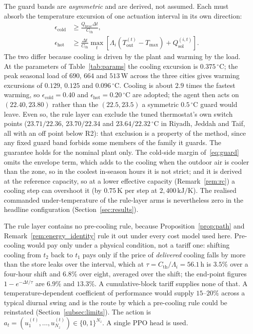 \documentclass[3p,twocolumn,number]{elsarticle}
\newcommand{\Tmax}{T_{\max}}
\newcommand{\Tout}{T_{\mathrm{out}}}
\newcommand{\Cth}{C_{\mathrm{th}}}
\newcommand{\Qhvac}{Q_{\mathrm{hvac}}}
\begin{document}
The guard bands are \emph{asymmetric} and are derived, not assumed. Each must absorb the temperature excursion of one actuation interval in its own direction:
\begin{equation}
\begin{aligned}
  \epsilon_{\mathrm{cold}}&\ge\frac{\Qhvac\Delta t}{\Cth},\\
  \epsilon_{\mathrm{hot}}&\ge\frac{\Delta t}{\Cth}\max_t\!\left[\Lambda_i(\Tout^{(t)}{-}\Tmax)+Q_{\mathrm{sol}}^{(i,t)}\right].
\end{aligned}
  \label{eq:guard}
\end{equation}
The two differ because cooling is driven by the plant and warming by the load. At the parameters of Table~\ref{tab:params} the cooling excursion is $0.375\,^\circ$C; the peak seasonal load of $690$, $664$ and $513\,$W across the three cities gives warming excursions of $0.129$, $0.125$ and $0.096\,^\circ$C. Cooling is about $2.9$ times the fastest warming, so $\epsilon_{\mathrm{cold}}=0.40$ and $\epsilon_{\mathrm{hot}}=0.20\,^\circ$C are adopted; the agent then acts on $(22.40,23.80)$ rather than the $(22.5,23.5)$ a symmetric $0.5\,^\circ$C guard would leave. Even so, the rule layer can exclude the tuned thermostat's own switch points ($23.71/22.36$, $23.70/22.34$ and $23.64/22.32\,^\circ$C in Riyadh, Jeddah and Taif, all with an off point below R2): that exclusion is a property of the method, since any fixed guard band forbids some members of the family it guards. The guarantee holds for the nominal plant only. The cold-side margin of~\eqref{eq:guard} omits the envelope term, which adds to the cooling when the outdoor air is cooler than the zone, so in the coolest in-season hours it is not strict; and it is derived at the reference capacity, so at a lower effective capacity (Remark~\ref{rem:rc}) a cooling step can overshoot it (by $0.75\,$K per step at $2{,}400\,\text{kJ/K}$). The realised commanded under-temperature of the rule-layer arms is nevertheless zero in the headline configuration (Section~\ref{sec:results}).

The rule layer contains no pre-cooling rule, because Proposition~\ref{prop:path} and Remark~\ref{rem:energy_identity} rule it out under every cost model used here. Pre-cooling would pay only under a physical condition, not a tariff one: shifting cooling from $t_2$ back to $t_1$ pays only if the price of \emph{delivered} cooling falls by more than the store leaks over the interval, which at $\tau=\Cth/\Lambda_i=56.1\,$h is $3.5\%$ over a four-hour shift and $6.8\%$ over eight, averaged over the shift; the end-point figures $1-e^{-\Delta t/\tau}$ are $6.9\%$ and $13.3\%$. A cumulative-block tariff supplies none of that. A temperature-dependent coefficient of performance would supply $15$--$20\%$ across a typical diurnal swing and is the route by which a pre-cooling rule could be reinstated (Section~\ref{subsec:limits}). The action is $a_t=(u_1^{(t)},\ldots,u_{N_z}^{(t)})\in\{0,1\}^{N_z}$. A single PPO head is used.
 
\end{document}
